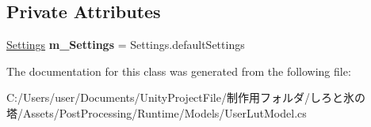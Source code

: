 \subsection*{Private Attributes}
\begin{DoxyCompactItemize}
\item 
\mbox{\label{class_unity_engine_1_1_post_processing_1_1_user_lut_model_af3dd88c95ec4abcaa736d22d0bd7cbe5}} 
\hyperlink{struct_unity_engine_1_1_post_processing_1_1_user_lut_model_1_1_settings}{Settings} {\bfseries m\+\_\+\+Settings} = Settings.\+default\+Settings
\end{DoxyCompactItemize}


The documentation for this class was generated from the following file\+:\begin{DoxyCompactItemize}
\item 
C\+:/\+Users/user/\+Documents/\+Unity\+Project\+File/制作用フォルダ/しろと氷の塔/\+Assets/\+Post\+Processing/\+Runtime/\+Models/User\+Lut\+Model.\+cs\end{DoxyCompactItemize}
